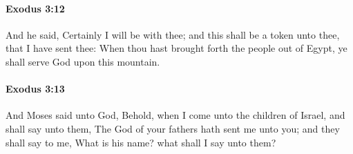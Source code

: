 		\paragraph{Exodus 3:12} %
			\label{EXODUS-3-12}

			And he said, Certainly I will be with thee; and this shall be a token unto thee, that I have sent thee: When thou hast brought forth the people out of Egypt, ye shall serve God upon this mountain.


		\paragraph{Exodus 3:13} %
			\label{EXODUS-3-13}

			And Moses said unto God, Behold, when I come unto the children of Israel, and shall say unto them, The God of your fathers hath sent me unto you; and they shall say to me, What is his name? what shall I say unto them?

